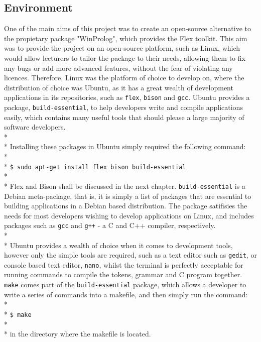 \documentclass[12pt]{report}
\begin{document}
\subsection{Environment}\label{subsec:dev_environment}
One of the main aims of this project was to create an open-source alternative to the propietary package "WinProlog", which provides the Flex toolkit.  This aim was to provide the project on an open-source platform, such as Linux, which would allow lecturers to tailor the package to their needs, allowing them to fix any bugs or add more advanced features, without the fear of violating any licences.  Therefore, Linux was the platform of choice to develop on, where the distribution of choice was Ubuntu, as it has a great wealth of development applications in its repositories, such as \texttt{flex}, \texttt{bison} and \texttt{gcc}.  Ubuntu provides a package, \texttt{build-essential}, to help developers write and compile applications easily, which contains many useful tools that should please a large majority of software developers.
\\*
\\*
Installing these packages in Ubuntu simply required the following command:
\\*
\\*
\texttt{\$ sudo apt-get install flex bison build-essential}
\\*
\\*
Flex and Bison shall be discussed in the next chapter.  \texttt{build-essential} is a Debian meta-package, that is, it is simply a list of packages that are essential to building applications in a Debian based distribution.  The package satifisies the needs for most developers wishing to develop applications on Linux, and includes packages such as \texttt{gcc} and \texttt{g++} - a C and C++ compiler, respectively.
\\*
\\*
Ubuntu provides a wealth of choice when it comes to development tools, however only the simple tools are required, such as a text editor such as \texttt{gedit}, or console based text editor, \texttt{nano}, whilst the terminal is perfectly acceptable for running commands to compile the tokens, grammar and C program together.  \texttt{make} comes part of the \texttt{build-essential} package, which allows a developer to write a series of commands into a makefile, and then simply run the command:\\*\\*
\texttt{\$ make}
\\*
\\*
in the directory where the makefile is located.
\end{document}
